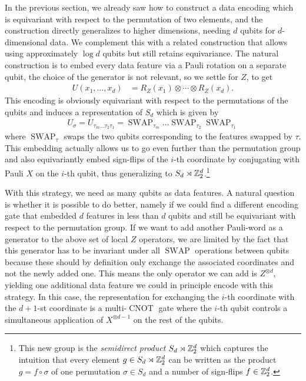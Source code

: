 \documentclass[a4paper,twocolumn,notitlepage,nofootinbib,superscriptaddress,floatfix]{revtex4-2}
\newcommand{\SWAP}{\ensuremath{\operatorname{SWAP}}}
\newcommand{\CNOT}{\ensuremath{\operatorname{CNOT}}}
\begin{document}
In the previous section, we already saw how to construct a data encoding which is equivariant with respect to the permutation of two elements, and the construction directly generalizes to higher dimensions, needing $d$ qubits for $d$-dimensional data. We complement this with a related construction that allows using approximately $\log d$ qubits but still retains equivariance. 
The natural construction is to embed every data feature via a Pauli rotation on a separate qubit, the choice of the generator is not relevant, so we settle for $Z$, to get
\begin{align}
    U(x_1,\ldots, x_d) &= R_Z(x_1) \otimes \cdots\otimes R_Z(x_d).
\end{align}
This encoding is obviously equivariant with respect to the permutations of the qubits and induces a representation of $S_d$ which is given by
\begin{align}
   U_\sigma = U_{\tau_m \dots \tau_2 \tau_1} = \SWAP_{\tau_m}  \dots \SWAP_{\tau_2} \SWAP_{\tau_1}
\end{align}
where $\SWAP_{\tau}$ swaps the two qubits corresponding to the features swapped by $\tau$. This embedding actually allows us to go even further than the permutation group and also equivariantly embed sign-flips of the $i$-th coordinate by conjugating with Pauli $X$ on the $i$-th qubit, thus generalizing to $S_d \rtimes \mathbb{Z}_2^d$.\footnote{
    This new group is the \emph{semidirect product} $S_d \rtimes\mathbb{Z}_2^d$ which captures the intuition that every element $g\in S_d\rtimes\mathbb{Z}_2^d$ can be written as the product $g=f\circ\sigma$ of one permutation $\sigma\in S_d$ and a number of sign-flips $f\in\mathbb{Z}_2^d$.
}

With this strategy, we need as many qubits as data features.
A natural question is whether it is possible to do better, namely if we could find a different encoding gate that embedded $d$ features in less than $d$ qubits and still be equivariant with respect to the permutation group.
If we want to add another Pauli-word as a generator to the above set of local $Z$ operators, we are limited by the fact that this generator has to be invariant under all $\SWAP$ operations between qubits because these should by definition only exchange the associated coordinates and not the newly added one. This means the only operator we can add is $Z^{\otimes d}$, yielding one additional data feature we could in principle encode with this strategy. In this case, the representation for exchanging the $i$-th coordinate with the $d+1$-st coordinate is a multi-$\CNOT$ gate where the $i$-th qubit controls a simultaneous application of $X^{\otimes d-1}$ on the rest of the qubits.
\end{document}
